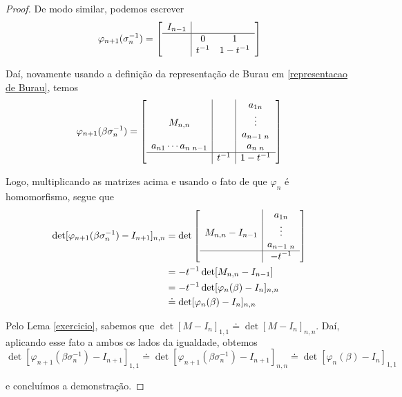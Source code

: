 \documentclass[a4paper,portuguese,11pt,twoside, leqno]{book}
\theoremstyle{definition}
\begin{document}
\begin{proof}
		\par\vspace{0.3cm} De modo similar, podemos escrever
		\begin{equation*}
		\varphi_{n+1}(\sigma_n^{-1}) = \left[\begin{array}{c|cc}
		I_{n-1} & & \\
		\hline
		& 0 & 1 \\
		& t^{-1} & 1-t^{-1}
		\end{array}\right]
		\end{equation*}
		\par\vspace{0.3cm} Daí, novamente usando a definição da representação de Burau em \eqref{representacao de Burau}, temos
		\begin{equation*}
		\varphi_{n+1}(\beta\sigma_n^{-1}) = \left[\begin{array}{c|c|c}
		&  & a_{1n} \\
		M_{n,n} &  & \vdots \\
		&  & a_{n-1\text{ }n} \\
		a_{n1}\cdots a_{n\text{ }n-1} &  & a_{n\text{ }n} \\
		\hline 
		& t^{-1} & 1-t^{-1}
		\end{array}\right]
		\end{equation*}
		\par\vspace{0.3cm} Logo, multiplicando as matrizes acima e usando o fato de que $\varphi_n$ é homomorfismo, segue que
		\begin{align*}
		\det[\varphi_{n+1}(\beta\sigma_n^{-1}) - I_{n+1}]_{n,n} &= \det\left[\begin{array}{c|c}
		& a_{1n} \\
		M_{n,n} - I_{n-1} &  \vdots \\
		& a_{n-1\text{ }n} \\
		\hline
		& -t^{-1}
		\end{array}\right] \\
		&= -t^{-1}\det[M_{n,n} - I_{n-1}] \\
		&= -t^{-1}\det[\varphi_n(\beta) - I_n]_{n,n} \\
		&\doteq \det[ \varphi_n(\beta) - I_n]_{n,n}
		\end{align*} 
		\par\vspace{0.3cm} Pelo Lema \eqref{exercicio}, sabemos que $\det[M-I_n]_{1,1}\doteq\det[M-I_n]_{n,n}$. Daí, aplicando esse fato a ambos os lados da igualdade, obtemos
		\begin{equation*}
		\det[\varphi_{n+1}(\beta\sigma_n^{-1}) - I_{n+1}]_{1,1}\doteq\det[\varphi_{n+1}(\beta\sigma_n^{-1}) - I_{n+1}]_{n,n}\doteq\det[\varphi_n(\beta) - I_n]_{1,1}
		\end{equation*}
		\par\vspace{0.3cm} e concluímos a demonstração.	
	\end{proof}
\end{document}
